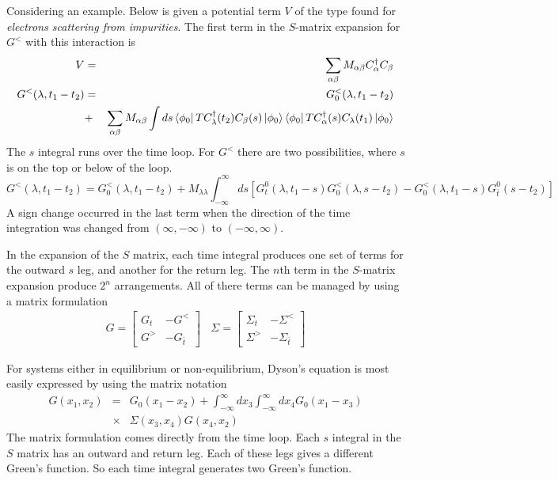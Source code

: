 Considering an example. Below is given a potential term $V$ of the type found for \textit{electrons scattering from impurities}.
The first term in the $S$-matrix expansion for $G^<$ with this interaction is
\begin{eqnarray} \label{2.154}
V &=& \sum_{\alpha \beta} M_{\alpha\beta} C^\dagger_\alpha C_\beta \nonumber \\
G^<(\lambda,t_1-t_2) &=& G^<_0(\lambda,t_1-t_2) \\
&+& \sum_{\alpha\beta}M_{\alpha\beta} \int ds \bra{\phi_0} T C^\dagger_\lambda(t_2) C_\beta (s) \ket{\phi_0} \bra{\phi_0} TC^\dagger_\alpha(s) C_\lambda(t_1) \ket{\phi_0} \nonumber
\end{eqnarray}
The $s$ integral runs over the time loop.
For $G^<$ there are two possibilities, where $s$ is on the top or below of the loop.
\begin{equation}
  G^<(\lambda,t_1-t_2) = G_0^<(\lambda,t_1-t_2) + M_{\lambda\lambda} \int_{-\infty}^\infty ds [G^0_t(\lambda,t_1-s)G_0^<(\lambda,s-t_2)
  - G_0^<(\lambda,t_1-s)G^0_{\bar{t}}(s-t_2)] \label{2.155}
\end{equation}
A sign change occurred in the last term when the direction of the time integration was changed from $(\infty,-\infty)$ to $(-\infty,\infty)$.

In the expansion of the $S$ matrix, each time integral produces one set of terms for the outward $s$ leg, and another for the return leg.
The $n$th term in the $S$-matrix expansion produce $2^n$ arrangements.
All of there terms can be managed by using a matrix formulation
\begin{eqnarray} \label{2.156}
  G =
  \begin{bmatrix}
  G_t & -G^<\\
  G^> & -G_{\bar{t}}
  \end{bmatrix}
  ~ ~ ~ ~
  \Sigma =
  \begin{bmatrix}
  \Sigma_t & -\Sigma^< \\
  \Sigma^> & -\Sigma_{\bar{t}}
  \end{bmatrix}
\end{eqnarray}

For systems either in equilibrium or non-equilibrium, Dyson's equation is most easily expressed by using the matrix notation
\begin{eqnarray}
  G(x_1,x_2) &=& G_0(x_1-x_2) + \int_{-\infty}^\infty dx_3 \int_{-\infty}^\infty dx_4 G_0(x_1-x_3) \nonumber \\
  &\times& \Sigma(x_3,x_4) G(x_4,x_2) \label{2.157}
\end{eqnarray}
The matrix formulation comes directly from the time loop.
Each $s$ integral in the $S$ matrix has an outward and return leg.
Each of these legs gives a different Green's function. So each time integral generates two Green's function.


